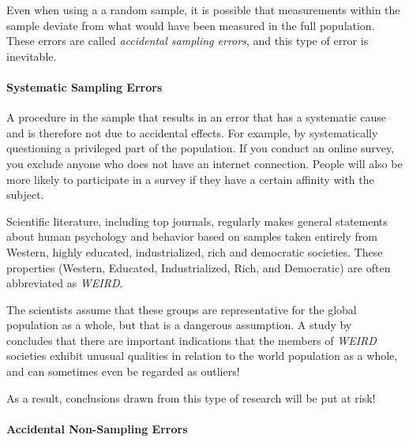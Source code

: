 Even when using a a random sample, it is possible that measurements within the sample deviate from what would have been measured in the full population. These errors are called \emph{accidental sampling errors}, and this type of error is inevitable.


\paragraph{Systematic Sampling Errors}

A procedure in the sample that results in an error that has a systematic cause and is therefore not due to accidental effects.
For example, by systematically questioning a privileged part of the population.
If you conduct an online survey, you exclude anyone who does not have an internet connection.
People will also be more likely to participate in a survey if they have a certain affinity with the subject.

\begin{example}
    Scientific literature, including top journals, regularly makes general statements about human psychology and behavior based on samples taken entirely from Western, highly educated, industrialized, rich and democratic societies. These properties (Western, Educated, Industrialized, Rich, and Democratic) are often abbreviated as \emph{WEIRD}.
    
    The scientists assume that these groups are representative for the global population as a whole, but that is a dangerous assumption.
    A study by~\textcite{HenrichEtAl2010} concludes that there are important indications that the members of \emph{WEIRD} societies exhibit unusual qualities in relation to the world population as a whole, and can sometimes even be regarded as outliers!
    
    As a result, conclusions drawn from this type of research will be put at risk!
\end{example}

\paragraph{Accidental Non-Sampling Errors}

